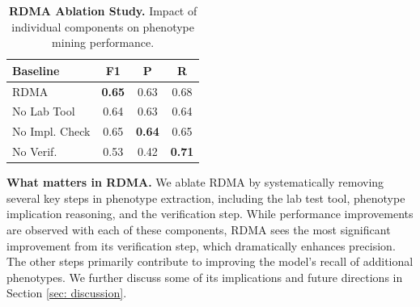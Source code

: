 \begin{table}
    \centering
    \small %
    \begin{tabular}{lccc}
        \toprule
        \textbf{Baseline} & \textbf{F1} & \textbf{P} & \textbf{R} \\
        \midrule
        RDMA & \textbf{0.65} & 0.63 & 0.68 \\
        No Lab Tool & 0.64 & 0.63 & 0.64 \\
        No Impl. Check & 0.65 & \textbf{0.64} & 0.65 \\
        No Verif. & 0.53 & 0.42 & \textbf{0.71} \\
        \bottomrule
    \end{tabular}
    \caption{\textbf{RDMA Ablation Study.} Impact of individual components on phenotype mining performance.}
    \label{tab:rdma_ablation}
\end{table}

\textbf{What matters in RDMA.} We ablate RDMA by systematically removing several key steps in phenotype extraction, including the lab test tool, phenotype implication reasoning, and the verification step. While performance improvements are observed with each of these components, RDMA sees the most significant improvement from its verification step, which dramatically enhances precision. The other steps primarily contribute to improving the model's recall of additional phenotypes. We further discuss some of its implications and future directions in Section \ref{sec: discussion}.

